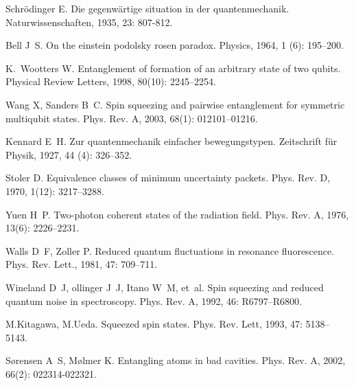 \begin{thebibliography}{113}
	Schrödinger E.
	\newblock Die gegenwärtige situation in der quantenmechanik\allowbreak[J].
	\newblock Naturwissenschaften, 1935, 23: 807-812.
	
	Bell J~S.
	\newblock On the einstein podolsky rosen paradox\allowbreak[J].
	\newblock Physics, 1964, 1 (6): 195--200.
	
	K.~Wootters W.
	\newblock Entanglement of formation of an arbitrary state of two
	qubits\allowbreak[J].
	\newblock Physical Review Letters, 1998, 80(10): 2245--2254.
	
	Wang X, Sanders B~C.
	\newblock Spin squeezing and pairwise entanglement for symmetric multiqubit
	states\allowbreak[J].
	\newblock Phys. Rev. A, 2003, 68(1): 012101--01216.
	
	Kennard E~H.
	\newblock Zur quantenmechanik einfacher bewegungstypen\allowbreak[J].
	\newblock Zeitschrift f{\"u}r Physik, 1927, 44 (4): 326--352.
	
	Stoler D.
	\newblock Equivalence classes of minimum uncertainty packets\allowbreak[J].
	\newblock Phys. Rev. D, 1970, 1(12): 3217--3288.
	
	Yuen H~P.
	\newblock Two-photon coherent states of the radiation field\allowbreak[J].
	\newblock Phys. Rev. A, 1976, 13(6): 2226--2231.
	
	Walls D~F, Zoller P.
	\newblock Reduced quantum fluctuations in resonance fluorescence\allowbreak[J].
	\newblock Phys. Rev. Lett., 1981, 47: 709--711.
	
	Wineland D~J, ollinger J~J, Itano W~M, et~al.
	\newblock Spin squeezing and reduced quantum noise in
	spectroscopy\allowbreak[J].
	\newblock Phys. Rev. A, 1992, 46: R6797--R6800.
	
	M.Kitagawa, M.Ueda.
	\newblock Squeezed spin states\allowbreak[J].
	\newblock Phys. Rev. Lett, 1993, 47: 5138--5143.
	
	S\o{}rensen A~S, M\o{}lmer K.
	\newblock Entangling atoms in bad cavities\allowbreak[J].
	\newblock Phys. Rev. A, 2002, 66(2): 022314-022321.
	

\end{thebibliography}
